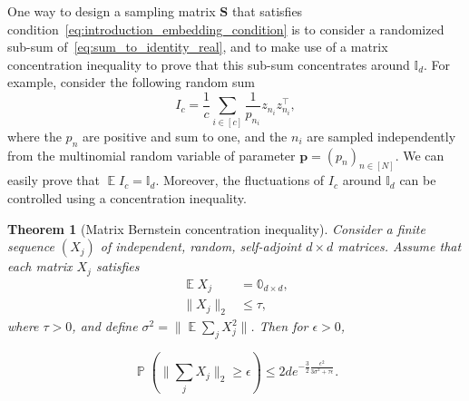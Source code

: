 \documentclass[twoside,11pt]{book}
\newtheorem{theorem}{Theorem}
\numberwithin{theorem}{chapter}
\numberwithin{definition}{chapter}
\numberwithin{proposition}{chapter}
\numberwithin{corollary}{chapter}
\numberwithin{example}{chapter}
\numberwithin{lemma}{chapter}
\numberwithin{assumption}{chapter}
\numberwithin{equation}{chapter}
\numberwithin{figure}{chapter}
\DeclareMathOperator{\Tran}{\intercal}
\DeclareMathOperator{\EX}{\mathbb{E}}
\DeclareMathOperator{\Prb}{\mathbb{P}}
\begin{document}
One way to design a sampling matrix $\bm{S}$ that satisfies condition~\eqref{eq:introduction_embedding_condition} is to consider a randomized sub-sum of~\eqref{eq:sum_to_identity_real}, and to make use of a matrix concentration inequality to prove that this sub-sum concentrates around $\mathbb{I}_{d}$. For example, consider the following random sum
\begin{equation}\label{eq:introduction_random_subsample}
I_{c} = \frac{1}{c}\sum\limits_{i \in [c]} \frac{1}{p_{n_{i}}}z_{{n_{i}}}z_{{n_{i}}}^{\Tran},
\end{equation}
where the $p_n$ are positive and sum to one, and the $n_{i}$ are sampled independently from the multinomial random variable of parameter $\bm{p} = (p_{n})_{n \in [N]}$. We can easily prove  that $\EX I_{c} = \mathbb{I}_{d}$. Moreover, the fluctuations of $I_{c}$ around $\mathbb{I}_{d}$ can be controlled using a concentration inequality.
\begin{theorem}[Matrix Bernstein concentration inequality] \citep{Tro15}\label{thm:matrix_bernstein}
Consider a finite sequence $(X_{j})$ of independent, random, self-adjoint $d\times d$ matrices. Assume that each matrix $X_{j}$
satisfies 
\begin{align}
 \EX X_{j} &= \mathbb{0}_{d \times d},\\
 \|X_{j}\|_{2} &\leq \tau,
\end{align}
where $\tau >0$, and define $\sigma^{2} = \|\EX \sum\limits_{j} X_{j}^{2}\|$.
 Then for $\epsilon >0$, 

\begin{equation}
\Prb \left( \big\|\sum\limits_{j} X_{j} \big\|_{2} \geq \epsilon \right) \leq 2 d e^{-\frac{3}{2} \frac{\epsilon^{2}}{3\sigma^{2} + \tau \epsilon}}.
\end{equation}
\end{theorem}
\end{document}
